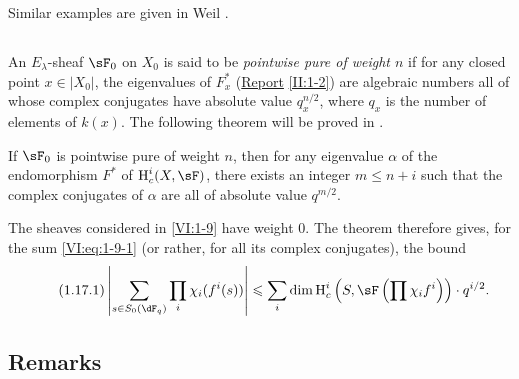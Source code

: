 Similar examples are given in Weil \cite[App V]{we74}. 





\subsection{}\label{VI:1-16}

An $E_\lambda$-sheaf $\sF_0$ on $X_0$ is said to be \emph{pointwise pure of 
weight $n$} if for any closed point $x\in |X_0|$, the eigenvalues of 
$F_x^\ast$ (\hyperref[II]{Report} \ref{II:1-2}) are algebraic numbers 
all of whose complex conjugates have absolute value 
$q_x^{n/2}$, where $q_x$ is the number of elements of $k(x)$. The 
following theorem will be proved in \cite{de80}. 





\begin{theorem_}\label{VI:1-17}
If $\sF_0$ is pointwise pure of weight $n$, then for any eigenvalue $\alpha$ 
of the endomorphism $F^\ast$ of $\h_c^i(X,\sF)$, there exists an integer 
$m\leqslant n+i$ such that the complex conjugates of $\alpha$ are all of 
absolute value $q^{m/2}$.
\end{theorem_}

The sheaves considered in \ref{VI:1-9} have weight $0$. The theorem 
therefore gives, for the sum \ref{VI:eq:1-9-1} (or rather, for all its 
complex conjugates), the bound 
\begin{equation*}\tag{1.17.1}\label{VI:eq:1-17-1}
  \left|\sum_{s\in S_0(\dF_q)} \prod_i \chi_i(f^i(s)) \right| \leqslant \sum_i \dim \h_c^i\left(S,\sF\left(\prod \chi_i f^i\right)\right)\cdot q^{i/2} \text{.}
\end{equation*}





\subsection{Remarks}\label{VI:1-18}

